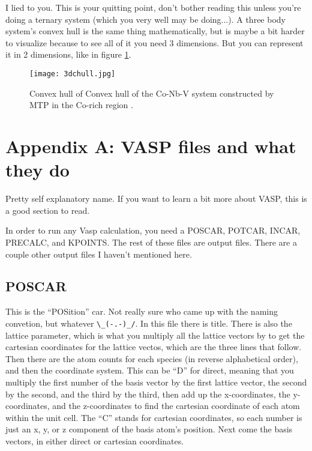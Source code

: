 \documentclass{article}
\begin{document}
I lied to you. This is your quitting point, don't bother reading this unless you're doing a
ternary system (which you very well may be doing...). A three body system's convex hull
is the same thing mathematically, but is maybe a bit harder to
visualize because to see all of it you need 3 dimensions.  But you can
represent it in 2 dimensions, like in figure \ref{fig:3dchull}.

\begin{figure}[h]
  \centering
  \texttt{[image: 3dchull.jpg]}
  \caption{Convex hull of Convex hull of the Co-Nb-V system
    constructed by MTP in the Co-rich region
    \cite{gubaev2019accelerating}.  }
  \label{fig:3dchull}
\end{figure}


\FloatBarrier

\section*{Appendix A: VASP files and what they do} \label{sec:vaspinput} %
Pretty self explanatory name. If you want to learn a bit more about
VASP, this is a good section to read.

In order to run any Vasp calculation, you need a POSCAR, POTCAR,
INCAR, PRECALC, and KPOINTS. The rest of these files are output
files. There are a couple other output files I haven't mentioned
here. 

\subsection*{POSCAR}
This is the ``POSition'' car. Not really sure who came up with the
naming convetion, but whatever \verb|\_(-.-)_/|.
In this file there is title. There is also the lattice parameter,
which is what you multiply all the lattice vectors by to get the
cartesian coordinates for the lattice vectos, which are the three
lines that follow. Then there are the atom counts for each species (in
reverse alphabetical order), and then the coordinate system. This can
be ``D'' for direct, meaning that you multiply the first number of the
basis vector by the first lattice vector, the second by the second,
and the third by the third, then add up the x-coordinates, the
y-coordinates, and the z-coordinates to find the cartesian coordinate
of each atom within the unit cell. The ``C'' stands for cartesian
coordinates, so each number is just an x, y, or z component of the
basis atom's position. Next come the basis vectors, in either direct
or cartesian coordinates. 
\end{document}
